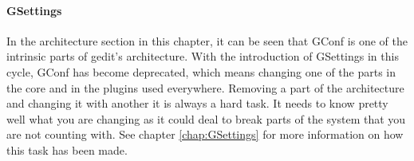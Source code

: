 \paragraph{GSettings}

In the architecture section in this chapter, it can be seen that GConf is one 
of the intrinsic parts of gedit's architecture. With the introduction of GSettings 
in this cycle, GConf has become deprecated, which means changing one of the parts 
in the core and in the plugins used everywhere. Removing a part of the architecture 
and changing it with another it is always a hard task. It needs to know pretty well 
what you are changing as it could deal to break parts of the system that you are not 
counting with. See chapter \ref{chap:GSettings} for more information on how this 
task has been made.
